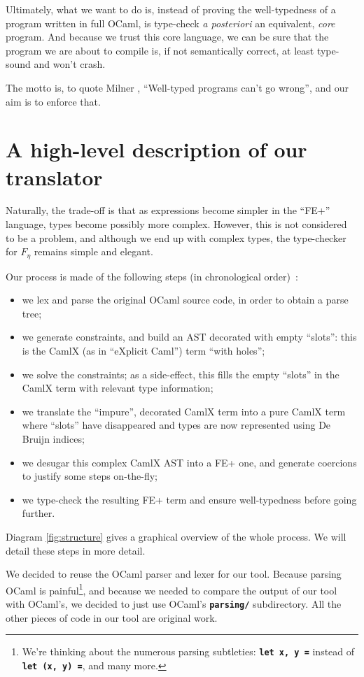 \documentclass[10pt,a4paper,twoside,titlepage,twocolumn]{article}
\newcommand{\code}[1]{\textbf{\texttt{#1}}}
\begin{document}
Ultimately, what we want to do is, instead of proving the well-typedness of a
program written in full OCaml, is type-check \emph{a posteriori} an equivalent,
\emph{core} program. And because we trust this core language, we can be sure
that the program we are about to compile is, if not semantically correct, at
least type-sound and won't crash.

The motto is, to quote Milner \cite{milner1978theory}, ``Well-typed programs
can't go wrong'', and our aim is to enforce that.

\section{A high-level description of our translator}

Naturally, the trade-off is that as expressions become simpler in the ``FE+''
language, types become possibly more complex. However, this is not considered to
be a problem, and although we end up with complex types, the type-checker for
$F_\eta$ remains simple and elegant.

Our process is made of the following steps (in chronological order)~:
\begin{itemize}
  \item we lex and parse the original OCaml source code, in order to obtain a
    parse tree;
  \item we generate constraints, and build an AST decorated with empty
    ``slots'': this is the CamlX (as in ``eXplicit Caml'') term ``with holes'';
  \item we solve the constraints; as a side-effect, this fills the empty
    ``slots'' in the CamlX term with relevant type information;
  \item we translate the ``impure'', decorated CamlX term into a pure CamlX term
    where ``slots'' have disappeared and types are now represented using De
    Bruijn indices;
  \item we desugar this complex CamlX AST into a FE+ one, and generate
    coercions to justify some steps on-the-fly;
  \item we type-check the resulting FE+ term and ensure well-typedness before
    going further.
\end{itemize}

Diagram \vref{fig:structure} gives a graphical overview of the whole process. We
will detail these steps in more detail.

We decided to reuse the OCaml parser and lexer for our tool. Because parsing
OCaml is painful\footnote{We're thinking about the numerous parsing subtleties:
\code{let x, y =} instead of \code{let (x, y) =}, and many more.}, and because
we needed to compare the output of our tool with OCaml's, we decided to just use
OCaml's \code{parsing/} subdirectory. All the other pieces of code in our tool
are original work.
\end{document}
